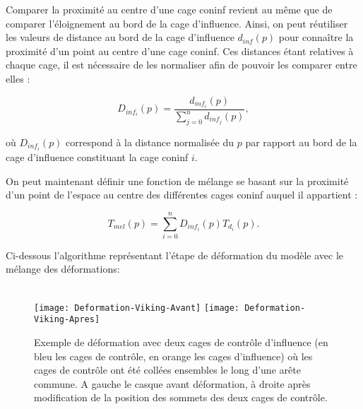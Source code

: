Comparer la proximité au centre d'une cage coninf revient au même que de
comparer l'éloignement au bord de la cage d'influence. Ainsi, on peut
réutiliser les valeurs de distance au bord de la cage d'influence $d_{inf}(p)$
pour connaître la proximité d'un point au centre d'une cage coninf. Ces
distances étant relatives à chaque cage, il est nécessaire de les normaliser
afin de pouvoir les comparer entre elles :

\begin{displaymath}
  D_{inf_i}(p) = \frac{d_{inf_i}(p)}{\sum_{j=0}^n d_{inf_j}(p)}, 
\end{displaymath}

où $D_{inf_i}(p)$ correspond à la distance normalisée du $p$ par rapport au
bord de la cage d'influence constituant la cage coninf $i$.

On peut maintenant définir une fonction de mélange se basant sur la proximité
d'un point de l'espace au centre des différentes cages coninf auquel il
appartient :

\begin{displaymath}
  T_{mel}(p) = \sum_{i=0}^n D_{inf_i}(p) T_{d_i}(p).
\end{displaymath}

Ci-dessous l'algorithme représentant l'étape de déformation du modèle avec le
mélange des déformations: \\

 \\

\begin{figure}[ht]
  \begin{center}
    \texttt{[image: Deformation-Viking-Avant]}
    \texttt{[image: Deformation-Viking-Apres]}

    \caption[Exemple de déformation cage de contrôle d'influence] {Exemple de
déformation avec deux cages de contrôle d'influence (en bleu les cages de
contrôle, en orange les cages d'influence) où les cages de contrôle ont été
collées ensembles le long d'une arête commune. A gauche le casque avant
déformation, à droite après modification de la position des sommets des deux
cages de contrôle.}

  \end{center}
\end{figure}

